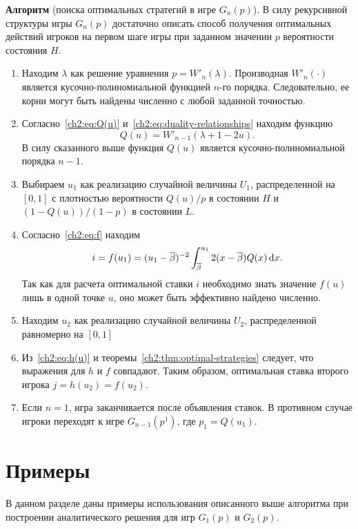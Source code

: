 {\noindent
\textbf{Алгоритм} (поиска оптимальных стратегий в игре $G_n(p)$).
В силу рекурсивной структуры игры $G_n(p)$ достаточно описать способ получения оптимальных действий игроков на первом шаге игры при заданном значении $p$ вероятности состояния $H$.
\begin{enumerate}
\item
  Находим $\lambda$ как решение уравнения 
  $
    p = W'_n(\lambda).
  $
  Производная $W'_n(\cdot)$ является кусочно-полиномиальной функцией $n$-го порядка.
  Следовательно, ее корни могут быть найдены численно с любой заданной точностью.
\item
  Согласно~\eqref{ch2:eq:Q(u)} и~\eqref{ch2:eq:duality-relationships} находим функцию 
  \[
    Q(u) = W'_{n-1}(\lambda + 1 - 2u).
  \]
  В силу сказанного выше функция $Q(u)$ является кусочно-полиномиальной порядка $n-1$.
\item
  Выбираем $u_1$ как реализацию случайной величины $U_1$, распределенной на $[0, 1]$ с плотностью вероятности $Q(u)/p$ в состоянии $H$ и $\left(1 - Q(u)\right)/(1-p)$ в состоянии $L$.
\item
  Согласно~\eqref{ch2:eq:f} находим 
  \[
    i = f(u_1) = (u_1 - {\overline{\beta}})^{-2} \int_{{\overline{\beta}}}^{u_1} 2 (x - {\overline{\beta}}) Q(x) \mathop{}\!\mathrm{d} x.
  \]
  Так как для расчета оптимальной ставки $i$ необходимо знать значение $f(u)$ лишь в одной точке $u$, оно может быть эффективно найдено численно.
\item
  Находим $u_2$ как реализацию случайной величины $U_2$, распределенной равномерно на $[0, 1]$
\item
  Из~\eqref{ch2:eq:h(u)} и теоремы~\ref{ch2:thm:optimal-strategies} следует, что выражения для $h$ и $f$ совпадают.
  Таким образом, оптимальная ставка второго игрока $j = h(u_2) = f(u_2)$.
\item
  Если $n = 1$, игра заканчивается после объявления ставок. В противном случае игроки переходят к игре $G_{n-1}(p^1)$, где $p_1 = Q(u_1)$.
\end{enumerate}

\section{Примеры}
В данном разделе даны примеры использования описанного выше алгоритма при построении аналитического решения для игр $G_1(p)$ и $G_2(p)$.

}
